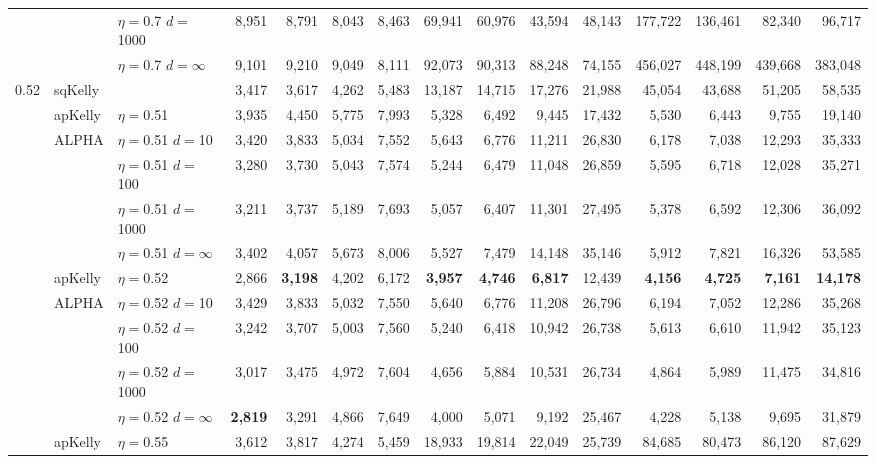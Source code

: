 \documentclass[12pt,runningheads]{llncs}
\begin{document}
{\begin{table}
\begin{tabular}{lll|rrrr|rrrr|rrrr}
&  & $\eta=$0.7 $d=$1000 & 8,951  & 8,791  & 8,043  & 8,463  & 69,941  & 60,976  & 43,594  & 48,143  & 177,722  & 136,461  & 82,340  & 96,717  \\
 &  & $\eta=$0.7 $d=\infty$ & 9,101  & 9,210  & 9,049  & 8,111  & 92,073  & 90,313  & 88,248  & 74,155  & 456,027  & 448,199  & 439,668  & 383,048  \\
\hline 0.52 & sqKelly & & 3,417  & 3,617  & 4,262  & 5,483  & 13,187  & 14,715  & 17,276  & 21,988  & 45,054  & 43,688  & 51,205  & 58,535  \\
\cline{2-15} & apKelly & $\eta=$0.51 & 3,935  & 4,450  & 5,775  & 7,993  & 5,328  & 6,492  & 9,445  & 17,432  & 5,530  & 6,443  & 9,755  & 19,140  \\
\cline{2-15}
& ALPHA & $\eta=$0.51 $d=$10 & 3,420  & 3,833  & 5,034  & 7,552  & 5,643  & 6,776  & 11,211  & 26,830  & 6,178  & 7,038  & 12,293  & 35,333  \\
&  & $\eta=$0.51 $d=$100 & 3,280  & 3,730  & 5,043  & 7,574  & 5,244  & 6,479  & 11,048  & 26,859  & 5,595  & 6,718  & 12,028  & 35,271  \\
&  & $\eta=$0.51 $d=$1000 & 3,211  & 3,737  & 5,189  & 7,693  & 5,057  & 6,407  & 11,301  & 27,495  & 5,378  & 6,592  & 12,306  & 36,092  \\
 &  & $\eta=$0.51 $d=\infty$ & 3,402  & 4,057  & 5,673  & 8,006  & 5,527  & 7,479  & 14,148  & 35,146  & 5,912  & 7,821  & 16,326  & 53,585  \\
\cline{2-15} & apKelly & $\eta=$0.52 & 2,866  & \bf{3,198}  & 4,202  & 6,172  & \bf{3,957}  & \bf{4,746}  & \bf{6,817}  & 12,439  & \bf{4,156}  & \bf{4,725}  & \bf{7,161}  & \bf{14,178}  \\
\cline{2-15}
& ALPHA & $\eta=$0.52 $d=$10 & 3,429  & 3,833  & 5,032  & 7,550  & 5,640  & 6,776  & 11,208  & 26,796  & 6,194  & 7,052  & 12,286  & 35,268  \\
&  & $\eta=$0.52 $d=$100 & 3,242  & 3,707  & 5,003  & 7,560  & 5,240  & 6,418  & 10,942  & 26,738  & 5,613  & 6,610  & 11,942  & 35,123  \\
&  & $\eta=$0.52 $d=$1000 & 3,017  & 3,475  & 4,972  & 7,604  & 4,656  & 5,884  & 10,531  & 26,734  & 4,864  & 5,989  & 11,475  & 34,816  \\
 &  & $\eta=$0.52 $d=\infty$ & \bf{2,819}  & 3,291  & 4,866  & 7,649  & 4,000  & 5,071  & 9,192  & 25,467  & 4,228  & 5,138  & 9,695  & 31,879  \\
\cline{2-15} & apKelly & $\eta=$0.55 & 3,612  & 3,817  & 4,274  & 5,459  & 18,933  & 19,814  & 22,049  & 25,739  & 84,685  & 80,473  & 86,120  & 87,629  \\

\end{tabular}
\end{table}}
\end{document}
